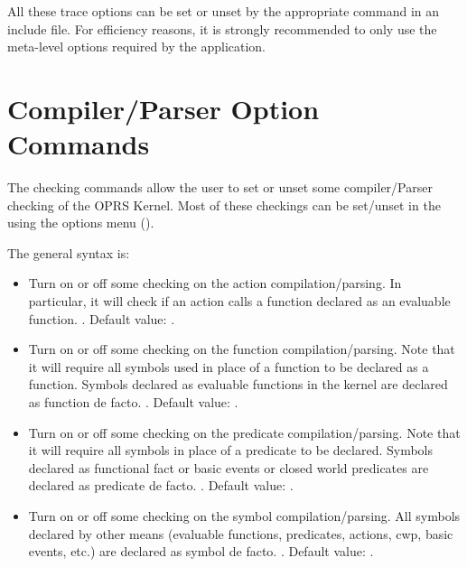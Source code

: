 All these trace options can be set or unset by the appropriate command in
an include file. For efficiency reasons, it is strongly recommended to only use the
meta-level options required by the application.

\section{\CPK{} Compiler/Parser Option Commands}

The checking commands allow the user to set or unset some compiler/Parser
checking of the OPRS Kernel. Most of these checkings can be set/unset in the
\XPK{} using the options menu ().

The general syntax is:


\begin{itemize}

\item {} Turn on or off some checking on the action
compilation/parsing. In particular, it will check if an action calls a function
declared as an evaluable function. . Default value:
.

\item {} Turn on or off some checking on the function
compilation/parsing. Note that it will require all symbols used in place of a
function to be declared as a function. Symbols declared as evaluable functions
in the kernel are declared as function de facto. . Default value: .

\item {} Turn on or off some checking on the predicate
compilation/parsing. Note that it will require all symbols in place of a
predicate to be declared. Symbols declared as functional fact or basic events or
closed world predicates are declared as predicate de facto. . Default value: .

\item {} Turn on or off some checking on the symbol
compilation/parsing. All symbols declared by other means (evaluable functions,
predicates, actions, cwp, basic events, etc.) are declared as symbol de
facto. . Default value: .

\end{itemize}

